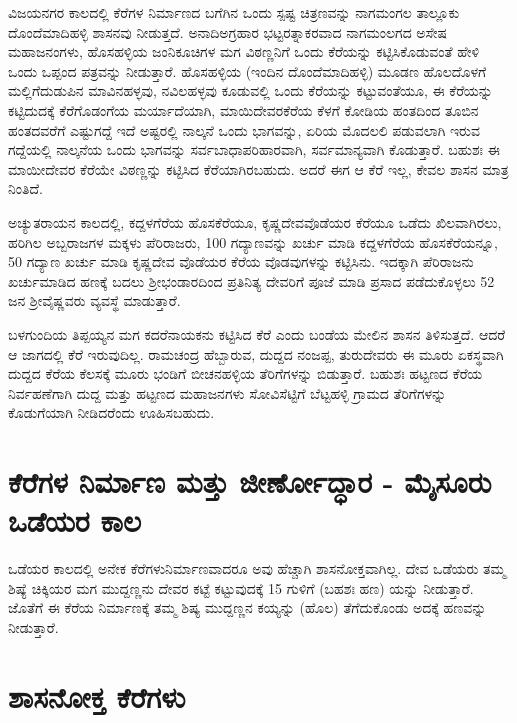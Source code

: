 ವಿಜಯನಗರ ಕಾಲದಲ್ಲಿ ಕೆರೆಗಳ ನಿರ್ಮಾಣದ ಬಗೆಗಿನ ಒಂದು ಸ್ಪಷ್ಟ ಚಿತ್ರಣವನ್ನು ನಾಗಮಂಗಲ ತಾಲ್ಲೂಕು ದೊಂದೆಮಾದಿಹಳ್ಳಿ ಶಾಸನವು ನೀಡುತ್ತದೆ. ಅನಾದಿಅಗ್ರಹಾರ ಭಟ್ಟರತ್ನಾಕರವಾದ ನಾಗಮಂಲಗದ ಅಸೇಷ ಮಹಾಜನಂಗಳು, ಹೊಸಹಳ್ಳಿಯ ಜಂನಿಕೂಚಿಗಳ ಮಗ ವಿಠಣ್ಣನಿಗೆ ಒಂದು ಕೆರೆಯನ್ನು ಕಟ್ಟಿಸಿಕೊಡುವಂತೆ ಹೇಳಿ ಒಂದು ಒಪ್ಪಂದ ಪತ್ರವನ್ನು ನೀಡುತ್ತಾರೆ. ಹೊಸಹಳ್ಳಿಯ (ಇಂದಿನ ದೊಂದೆಮಾದಿಹಳ್ಳಿ) ಮೂಡಣ ಹೊಲದೊಳಗೆ ಮಲ್ಲಿಗೆದುಡುಪಿನ ಮಾವಿನಹಳ್ಳವು, ನವಿಲಹಳ್ಳವು ಕೂಡುವಲ್ಲಿ ಒಂದು ಕೆರೆಯನ್ನು ಕಟ್ಟುವಂತೆಯೂ, ಈ ಕೆರೆಯನ್ನು ಕಟ್ಟಿದುದಕ್ಕೆ ಕೆರೆಗೊಡಂಗೆಯ ಮರ್ಯಾದೆಯಾಗಿ, ಮಾಯಿದೇವರಕೆರೆಯ ಕೆಳಗೆ ಕೋಡಿಯ ಹಂತದಿಂದ ತೂಬಿನ ಹಂತದವರೆಗೆ ಎಷ್ಟುಗದ್ದೆ ಇದೆ ಅಷ್ಟರಲ್ಲಿ ನಾಲ್ಕನೆ ಒಂದು ಭಾಗವನ್ನು, ಏರಿಯ ಮೊದಲಲಿ ಪಡುವಲಾಗಿ ಇರುವ ಗದ್ದೆಯಲ್ಲಿ ನಾಲ್ಕನೆಯ ಒಂದು ಭಾಗವನ್ನು ಸರ್ವಬಾಧಾಪರಿಹಾರವಾಗಿ, ಸರ್ವಮಾನ್ಯವಾಗಿ ಕೊಡುತ್ತಾರೆ. ಬಹುಶಃ ಈ ಮಾಯೀದೇವರ ಕೆರೆಯೇ ವಿಠಣ್ಣನ್ನು ಕಟ್ಟಿಸಿದ ಕೆರೆಯಾಗಿರಬಹುದು. ಅದರೆ ಈಗ ಆ ಕೆರೆ ಇಲ್ಲ, ಕೇವಲ ಶಾಸನ ಮಾತ್ರ ನಿಂತಿದೆ.

ಅಚ್ಯುತರಾಯನ ಕಾಲದಲ್ಲಿ, ಕದ್ದಳಗೆರೆಯ ಹೊಸಕೆರೆಯೂ, ಕೃಷ್ಣದೇವವೊಡೆಯರ ಕೆರೆಯೂ ಒಡೆದು ಖಿಲವಾಗಿರಲು, ಹರಿಗಿಲ ಅಬ್ಬರಾಜಗಳ ಮಕ್ಕಳು ಪೆರಿರಾಜರು, 100 ಗದ್ಯಾಣವನ್ನು ಖರ್ಚು ಮಾಡಿ ಕದ್ದಳಗೆರೆಯ ಹೊಸಕೆರೆಯನ್ನೂ, 50 ಗದ್ಯಾಣ ಖರ್ಚು ಮಾಡಿ ಕೃಷ್ಣದೇವ ವೊಡೆಯರ ಕೆರೆಯ ವೊಡವುಗಳನ್ನು ಕಟ್ಟಿಸಿನು. ಇದಕ್ಕಾಗಿ ಪೆರಿರಾಜನು ಖರ್ಚುಮಾಡಿದ ಹಣಕ್ಕೆ ಬದಲು ಶ‍್ರೀಭಂಡಾರದಿಂದ ಪ್ರತಿನಿತ್ಯ ದೇವರಿಗೆ ಪೂಜೆ ಮಾಡಿ ಪ್ರಸಾದ ಪಡೆದುಕೊಳ್ಳಲು 52 ಜನ ಶ‍್ರೀವೈಷ್ಣವರು ವ್ಯವಸ್ಥೆ ಮಾಡುತ್ತಾರೆ.

ಬಳಗುಂದಿಯ ತಿಪ್ಪಯ್ಯನ ಮಗ ಕದರೆನಾಯಕನು ಕಟ್ಟಿಸಿದ ಕೆರೆ ಎಂದು ಬಂಡೆಯ ಮೇಲಿನ ಶಾಸನ ತಿಳಿಸುತ್ತದೆ. ಆದರೆ ಆ ಜಾಗದಲ್ಲಿ ಕೆರೆ ಇರುವುದಿಲ್ಲ. ರಾಮಚಂದ್ರ ಹೆಬ್ಬಾರುವ, ದುದ್ದದ ನಂಜಪ್ಪ, ತುರುದೇವರು ಈ ಮೂರು ಏಕಸ್ಥವಾಗಿ ದುದ್ದದ ಕೆರೆಯ ಕೆಲಸಕ್ಕೆ ಮೂರು ಭಂಡಿಗೆ ಬೀಚನಹಳ್ಳಿಯ ತೆರಿಗೆಗಳನ್ನು ಬಿಡುತ್ತಾರೆ. ಬಹುಶಃ ಹಟ್ಟಣದ ಕೆರೆಯ ನಿರ್ವಹಣೆಗಾಗಿ ದುದ್ದ ಮತ್ತು ಹಟ್ಟಣದ ಮಹಾಜನಗಳು ಸೋವಿಸೆಟ್ಟಿಗೆ ಬೆಟ್ಟಹಳ್ಳಿ ಗ್ರಾಮದ ತೆರಿಗೆಗಳನ್ನು ಕೊಡುಗೆಯಾಗಿ ನೀಡಿದರೆಂದು ಊಹಿಸಬಹುದು.


\section{ಕೆರೆಗಳ ನಿರ್ಮಾಣ ಮತ್ತು ಜೀರ್ಣೋದ್ಧಾರ - ಮೈಸೂರು ಒಡೆಯರ ಕಾಲ}

ಒಡೆಯರ ಕಾಲದಲ್ಲಿ ಅನೇಕ ಕೆರೆಗಳುನಿರ್ಮಾಣವಾದರೂ ಅವು ಹೆಚ್ಚಾಗಿ ಶಾಸನೋಕ್ತವಾಗಿಲ್ಲ. ದೇವ ಒಡೆಯರು ತಮ್ಮ ಶಿಷ್ಯೆ ಚಿಕ್ಕಿಯರ ಮಗ ಮುದ್ದಣ್ಣನು ದೇವರ ಕಟ್ಟೆ ಕಟ್ಟುವುದಕ್ಕೆ 15 ಗುಳಿಗೆ (ಬಹಶಃ ಹಣ) ಯನ್ನು ನೀಡುತ್ತಾರೆ. ಜೊತೆಗೆ ಈ ಕೆರೆಯ ನಿರ್ಮಾಣಕ್ಕೆ ತಮ್ಮ ಶಿಷ್ಯ ಮುದ್ದಣ್ಣನ ಕಯ್ಯನ್ನು (ಹೊಲ) ತೆಗೆದುಕೊಂಡು ಅದಕ್ಕೆ ಹಣವನ್ನು ನೀಡುತ್ತಾರೆ.


\section{ಶಾಸನೋಕ್ತ ಕೆರೆಗಳು}

